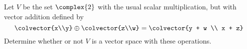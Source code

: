 %
Let $V$ be the set $\complex{2}$ with the usual scalar multiplication, but with vector addition defined by 
\begin{equation*}
\colvector{x\\y} \oplus \colvector{z\\w} = \colvector{y + w \\ x + z}
\end{equation*}
Determine whether or not $V$ is a vector space with these operations. 